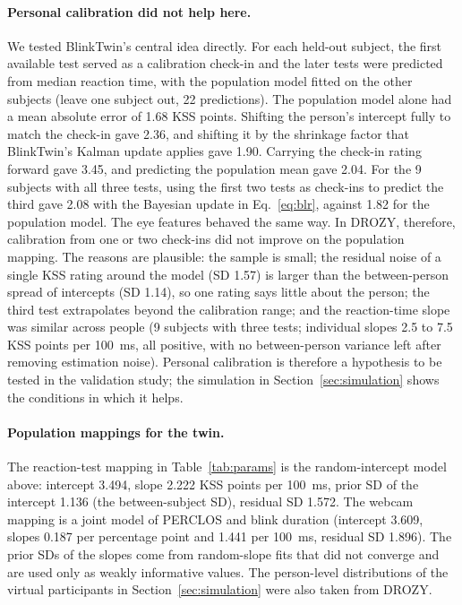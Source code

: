 \paragraph{Personal calibration did not help here.} We tested BlinkTwin's central idea directly. For each held-out subject, the first available test served as a calibration check-in and the later tests were predicted from median reaction time, with the population model fitted on the other subjects (leave one subject out, 22 predictions). The population model alone had a mean absolute error of 1.68 KSS points. Shifting the person's intercept fully to match the check-in gave 2.36, and shifting it by the shrinkage factor that BlinkTwin's Kalman update applies gave 1.90. Carrying the check-in rating forward gave 3.45, and predicting the population mean gave 2.04. For the 9 subjects with all three tests, using the first two tests as check-ins to predict the third gave 2.08 with the Bayesian update in Eq.~\eqref{eq:blr}, against 1.82 for the population model. The eye features behaved the same way. In DROZY, therefore, calibration from one or two check-ins did not improve on the population mapping. The reasons are plausible: the sample is small; the residual noise of a single KSS rating around the model (SD 1.57) is larger than the between-person spread of intercepts (SD 1.14), so one rating says little about the person; the third test extrapolates beyond the calibration range; and the reaction-time slope was similar across people (9 subjects with three tests; individual slopes 2.5 to 7.5 KSS points per 100~ms, all positive, with no between-person variance left after removing estimation noise). Personal calibration is therefore a hypothesis to be tested in the validation study; the simulation in Section~\ref{sec:simulation} shows the conditions in which it helps.

\paragraph{Population mappings for the twin.} The reaction-test mapping in Table~\ref{tab:params} is the random-intercept model above: intercept 3.494, slope 2.222 KSS points per 100~ms, prior SD of the intercept 1.136 (the between-subject SD), residual SD 1.572. The webcam mapping is a joint model of PERCLOS and blink duration (intercept 3.609, slopes 0.187 per percentage point and 1.441 per 100~ms, residual SD 1.896). The prior SDs of the slopes come from random-slope fits that did not converge and are used only as weakly informative values. The person-level distributions of the virtual participants in Section~\ref{sec:simulation} were also taken from DROZY.

